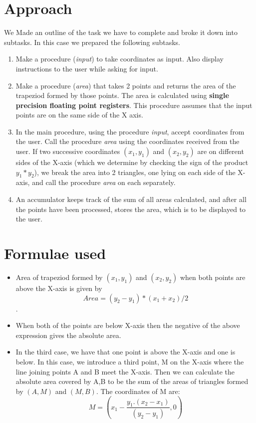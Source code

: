 \documentclass[hidelinks,12pt]{article}
\begin{document}
\section{Approach}
    We Made an outline of the task we have to complete and broke it down into subtasks.
    In this case we prepared the following subtasks. 
    \begin{enumerate}
        \item Make a procedure (\textit{input}) to take coordinates as input.
        Also display instructions to the user while asking for input. 
        \item Make a procedure (\textit{area}) that takes 2 points and returns the area of the 
        trapeziod formed by those points. The area is calculated using \textbf{single precision floating point registers}.
        This procedure assumes that the input points are on the same side of the X axis.
        \item In the main procedure, using the procedure \textit{input}, accept coordinates from the user.
        Call the procedure \textit{area} using the coordinates received from the user. If two successive coordinates \( (x_1, y_1) \) and \( (x_2, y_2) \) are on different
        sides of the X-axis (which we determine by checking the sign of the product \( y_1*y_2 \)), we break the area into 2 triangles, one lying on each side of the X-axis, and call the procedure
        \textit{area} on each separately.
        \item An accumulator keeps track of the sum of all areas calculated, and after all the points have
        been processed, stores the area, which is to be displayed to the user. 
    \end{enumerate}
\section{Formulae used}
\begin{itemize}
    \item Area of trapeziod formed by \( (x_1, y_1) \) and \( (x_2, y_2) \)  when both points are above the X-axis is given by \[ Area = (y_2 - y_1)*(x_1 + x_2)/2 \].
    \item When both of the points are below X-axis then the negative of the above expression gives the absolute area.
    \item In the third case, we have that one point is above the X-axis and one is below. In this case, we introduce a third point, M on the X-axis where the line joining points A and B meet
    the X-axis. Then we can calculate the absolute area covered by A,B to be the sum of the areas of triangles formed by $(A,M)$ and $(M,B)$. The coordinates of M are: \[ M = (x_1 -  \frac{y_1.(x_2 - x_1)}{(y_2 - y_1)},0)\]
\end{itemize}
\end{document}
